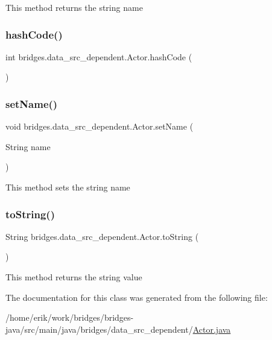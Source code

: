 This method returns the string name \mbox{\label{classbridges_1_1data__src__dependent_1_1_actor_a78e29e54c8a200ddbcbae2e0eb323722}} 
\subsubsection{\texorpdfstring{hash\+Code()}{hashCode()}}
{\footnotesize\ttfamily int bridges.\+data\+\_\+src\+\_\+dependent.\+Actor.\+hash\+Code (\begin{DoxyParamCaption}{ }\end{DoxyParamCaption})}

\mbox{\label{classbridges_1_1data__src__dependent_1_1_actor_a8a3650b446402d511bb4fe99827ff90a}} 
\subsubsection{\texorpdfstring{set\+Name()}{setName()}}
{\footnotesize\ttfamily void bridges.\+data\+\_\+src\+\_\+dependent.\+Actor.\+set\+Name (\begin{DoxyParamCaption}\item[{String}]{name }\end{DoxyParamCaption})}

This method sets the string name \mbox{\label{classbridges_1_1data__src__dependent_1_1_actor_a5210a5b38a4a311b92e7332aeddb65ff}} 
\subsubsection{\texorpdfstring{to\+String()}{toString()}}
{\footnotesize\ttfamily String bridges.\+data\+\_\+src\+\_\+dependent.\+Actor.\+to\+String (\begin{DoxyParamCaption}{ }\end{DoxyParamCaption})}

This method returns the string value 

The documentation for this class was generated from the following file\+:\begin{DoxyCompactItemize}
\item 
/home/erik/work/bridges/bridges-\/java/src/main/java/bridges/data\+\_\+src\+\_\+dependent/\hyperlink{_actor_8java}{Actor.\+java}\end{DoxyCompactItemize}
